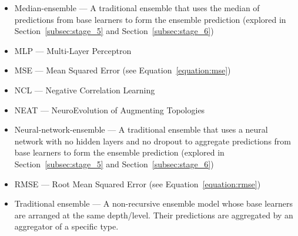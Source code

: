 \begin{itemize}
    \item Median-ensemble — A traditional ensemble that uses the median of predictions from base learners to form the ensemble prediction (explored in Section~\ref{subsec:stage_5} and Section~\ref{subsec:stage_6})
    \item MLP — Multi-Layer Perceptron
    \item MSE — Mean Squared Error (see Equation~\ref{equation:mse})
    \item NCL — Negative Correlation Learning
    \item NEAT — NeuroEvolution of Augmenting Topologies
    \item Neural-network-ensemble — A traditional ensemble that uses a neural network with no hidden layers and no dropout to aggregate predictions from base learners to form the ensemble prediction (explored in Section~\ref{subsec:stage_5} and Section~\ref{subsec:stage_6})
    \item RMSE — Root Mean Squared Error (see Equation~\ref{equation:rmse})
    \item Traditional ensemble — A non-recursive ensemble model whose base learners are arranged at the same depth/level. Their predictions are aggregated by an aggregator of a specific type. 
\end{itemize}
\newpage